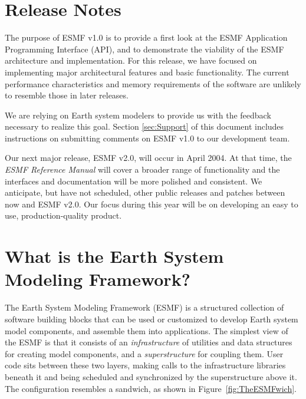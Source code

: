
\section{Release Notes}

The purpose of ESMF v1.0 is to provide a first look at the ESMF
Application Programming Interface (API), and to demonstrate the viability 
of the ESMF architecture and implementation.  For this release, we have focused 
on implementing major architectural features and basic functionality.  The 
current performance characteristics and memory requirements of the software 
are unlikely to resemble those in later releases.

We are relying on Earth system modelers to provide us with the feedback necessary 
to realize this goal.  Section \ref{sec:Support} of this document includes 
instructions on submitting comments on ESMF v1.0 to our development team.

Our next major release, ESMF v2.0, will occur in April 2004.  At that time, 
the {\it ESMF Reference Manual} will cover a broader range of functionality
and the interfaces and documentation will be more polished and consistent.  
We anticipate, but have 
not scheduled, other public releases and patches between now and ESMF v2.0.  
Our focus during this year will be on developing an easy to use, 
production-quality product.  

\section{What is the Earth System Modeling Framework?}

The Earth System Modeling Framework (ESMF) is a structured collection of 
software building blocks that can be used or customized to develop 
Earth system model components, and assemble them into applications.  
The simplest view of the ESMF is that it consists of an
{\it infrastructure} of utilities and data structures for creating 
model components, and a {\it superstructure} for coupling them.  
User code sits between these two layers, making calls to the infrastructure
libraries beneath it and being scheduled and synchronized by the 
superstructure above it.  The configuration resembles a sandwich, as
shown in Figure~\ref{fig:TheESMFwich}.

